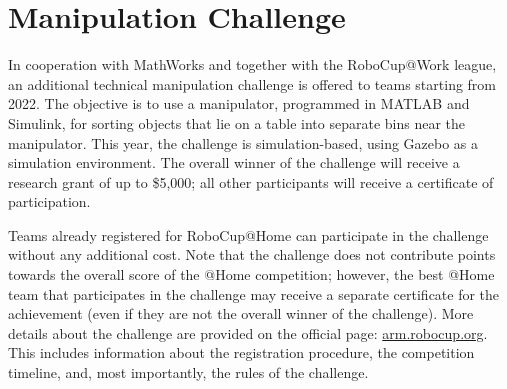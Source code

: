 \section{Manipulation Challenge}\label{sec:rules:manipulationChallenge}

In cooperation with MathWorks and together with the RoboCup@Work league, an additional technical manipulation challenge is offered to \AtHome{} teams starting from 2022. The objective is to use a manipulator, programmed in MATLAB and Simulink, for sorting objects that lie on a table into separate bins near the manipulator. This year, the challenge is simulation-based, using Gazebo as a simulation environment. The overall winner of the challenge will receive a research grant of up to \$5,000; all other participants will receive a certificate of participation.

Teams already registered for RoboCup@Home can participate in the challenge without any additional cost. Note that the challenge does not contribute points towards the overall score of the @Home competition; however, the best @Home team that participates in the challenge may receive a separate certificate for the achievement (even if they are not the overall winner of the challenge). More details about the challenge are provided on the official page: \url{arm.robocup.org}. This includes information about the registration procedure, the competition timeline, and, most importantly, the rules of the challenge.
